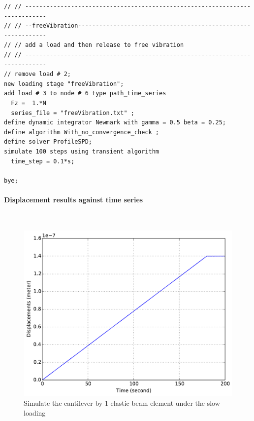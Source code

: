 \begin{lstlisting}
// // ----------------------------------------------------------------------------
// // --freeVibration-------------------------------------------------------------
// // add a load and then release to free vibration
// // ----------------------------------------------------------------------------
// remove load # 2;
new loading stage "freeVibration";
add load # 3 to node # 6 type path_time_series 
  Fz =  1.*N
  series_file = "freeVibration.txt" ;
define dynamic integrator Newmark with gamma = 0.5 beta = 0.25;
define algorithm With_no_convergence_check ;
define solver ProfileSPD;
simulate 100 steps using transient algorithm 
  time_step = 0.1*s;

bye;
\end{lstlisting}

\paragraph{Displacement results against time series} ~

\begin{figure}[!htb]
  \centering
  \includegraphics[width=12cm]{./Figure-files/_Chapter_Appendix_Illustrative_Examples/beam-5element-slowLoading.pdf}
  \caption{Simulate the cantilever by 1 elastic beam element under the slow loading}
  \label{fig_beam5_slow}
\end{figure}


